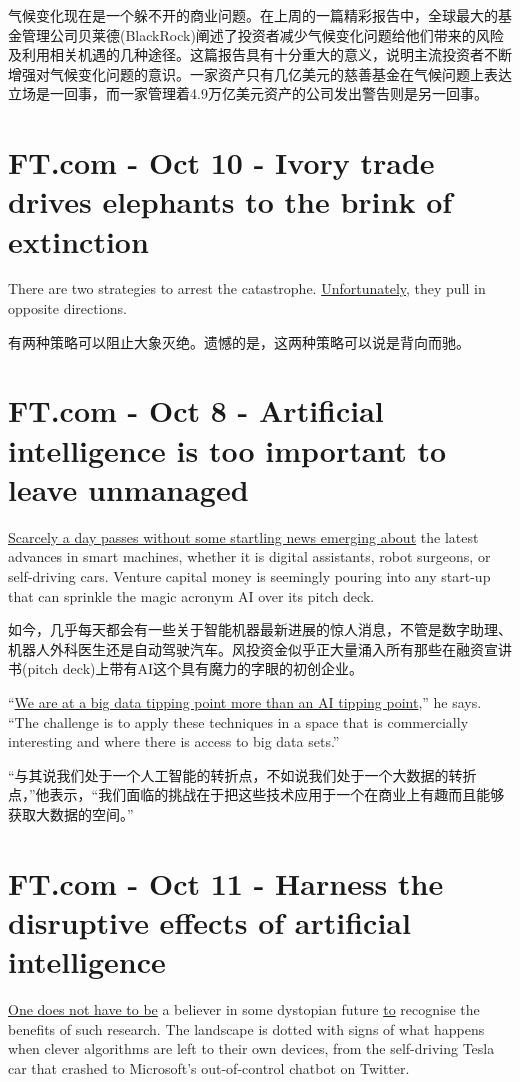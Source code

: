 \documentclass[UTF8]{ctexart}
\begin{document}
气候变化现在是一个躲不开的商业问题。在上周的一篇精彩报告中，全球最大的基金管理公司贝莱德(BlackRock)阐述了投资者减少气候变化问题给他们带来的风险及利用相关机遇的几种途径。这篇报告具有十分重大的意义，说明主流投资者不断增强对气候变化问题的意识。一家资产只有几亿美元的慈善基金在气候问题上表达立场是一回事，而一家管理着4.9万亿美元资产的公司发出警告则是另一回事。

\section{FT.com - Oct 10 - Ivory trade drives elephants to the brink of extinction}
There are two strategies to arrest the catastrophe. \underline{Unfortunately}, they pull in opposite directions.

有两种策略可以阻止大象灭绝。遗憾的是，这两种策略可以说是背向而驰。


\section{FT.com - Oct 8 - Artificial intelligence is too important to leave unmanaged}
\underline{Scarcely a day passes without some startling news emerging about} the latest advances in smart machines, whether it is digital assistants, robot surgeons, or self-driving cars. Venture capital money is seemingly pouring into any start-up that can sprinkle the magic acronym AI over its pitch deck.

如今，几乎每天都会有一些关于智能机器最新进展的惊人消息，不管是数字助理、机器人外科医生还是自动驾驶汽车。风投资金似乎正大量涌入所有那些在融资宣讲书(pitch deck)上带有AI这个具有魔力的字眼的初创企业。

“\underline{We are at a big data tipping point more than an AI tipping point},” he says. “The challenge is to apply these techniques in a space that is commercially interesting and where there is access to big data sets.”

“与其说我们处于一个人工智能的转折点，不如说我们处于一个大数据的转折点，”他表示，“我们面临的挑战在于把这些技术应用于一个在商业上有趣而且能够获取大数据的空间。”

\section{FT.com - Oct 11 - Harness the disruptive effects of artificial intelligence}
\underline{One does not have to be} a believer in some dystopian future \underline{to} recognise the benefits of such research. The landscape is dotted with signs of what happens when clever algorithms are left to their own devices, from the self-driving Tesla car that crashed to Microsoft’s out-of-control chatbot on Twitter.
\end{document}
